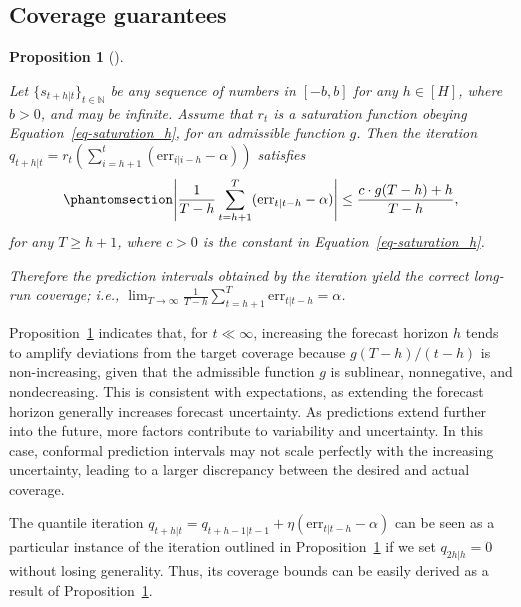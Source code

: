 \documentclass[
  11pt,
  a4paper,
]{article}
\theoremstyle{plain}
\newtheorem{proposition}{Proposition}[section]
\theoremstyle{remark}
\begin{document}
\subsection{Coverage guarantees}\label{coverage-guarantees}

\begin{proposition}[]\protect\hypertarget{prp-cov_rt}{}\label{prp-cov_rt}

Let \(\{s_{t+h|t}\}_{t\in\mathbb{N}}\) be any sequence of numbers in
\([-b, b]\) for any \(h\in[H]\), where \(b>0\), and may be infinite.
Assume that \(r_t\) is a saturation function obeying
Equation~\ref{eq-saturation_h}, for an admissible function \(g\). Then
the iteration
\(q_{t+h|t}=r_t\left(\sum_{i=h+1}^t(\mathrm{err}_{i|i-h}-\alpha)\right)\)
satisfies \begin{equation}\phantomsection\label{eq-cov_rt}{
\left|\frac{1}{T-h}\sum_{t=h+1}^{T}(\mathrm{err}_{t|t-h}-\alpha)\right| \leq \frac{c \cdot g(T-h) + h}{T-h},
}\end{equation} for any \(T \geq h+1\), where \(c>0\) is the constant in
Equation~\ref{eq-saturation_h}.

Therefore the prediction intervals obtained by the iteration yield the
correct long-run coverage; i.e.,
\(\lim _{T \rightarrow \infty} \frac{1}{T-h} \sum_{t=h+1}^T \mathrm{err}_{t|t-h} = \alpha\).

\end{proposition}

Proposition~\ref{prp-cov_rt} indicates that, for \(t \ll \infty\),
increasing the forecast horizon \(h\) tends to amplify deviations from
the target coverage because \(g(T-h)/(t-h)\) is non-increasing, given
that the admissible function \(g\) is sublinear, nonnegative, and
nondecreasing. This is consistent with expectations, as extending the
forecast horizon generally increases forecast uncertainty. As
predictions extend further into the future, more factors contribute to
variability and uncertainty. In this case, conformal prediction
intervals may not scale perfectly with the increasing uncertainty,
leading to a larger discrepancy between the desired and actual coverage.

The quantile iteration
\(q_{t+h|t}=q_{t+h-1|t-1}+\eta (\mathrm{err}_{t|t-h}-\alpha)\) can be
seen as a particular instance of the iteration outlined in
Proposition~\ref{prp-cov_rt} if we set \(q_{2h|h}=0\) without losing
generality. Thus, its coverage bounds can be easily derived as a result
of Proposition~\ref{prp-cov_rt}.
\end{document}
